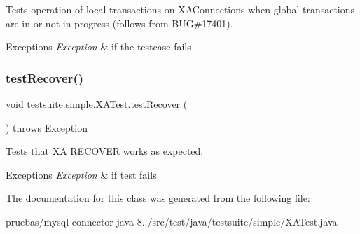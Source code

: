 Tests operation of local transactions on X\+A\+Connections when global transactions are in or not in progress (follows from B\+UG\#17401).


\begin{DoxyExceptions}{Exceptions}
{\em Exception} & if the testcase fails \\
\hline
\end{DoxyExceptions}
\mbox{\label{classtestsuite_1_1simple_1_1_x_a_test_aa3b48d0aaeb44cc191cba70d70e16234}} 
\subsubsection{\texorpdfstring{test\+Recover()}{testRecover()}}
{\footnotesize\ttfamily void testsuite.\+simple.\+X\+A\+Test.\+test\+Recover (\begin{DoxyParamCaption}{ }\end{DoxyParamCaption}) throws Exception}

Tests that XA R\+E\+C\+O\+V\+ER works as expected.


\begin{DoxyExceptions}{Exceptions}
{\em Exception} & if test fails \\
\hline
\end{DoxyExceptions}


The documentation for this class was generated from the following file\+:\begin{DoxyCompactItemize}
\item 
pruebas/mysql-\/connector-\/java-\/8../src/test/java/testsuite/simple/X\+A\+Test.\+java\end{DoxyCompactItemize}
